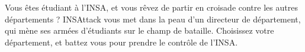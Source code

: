 Vous êtes étudiant à l'INSA, et vous rêvez de partir en croisade contre les autres départements ?
INSAttack vous met dans la peau d'un directeur de département, qui mène ses armées d'étudiants sur le champ de bataille.
Choisissez votre département, et battez vous pour prendre le contrôle de l'INSA.